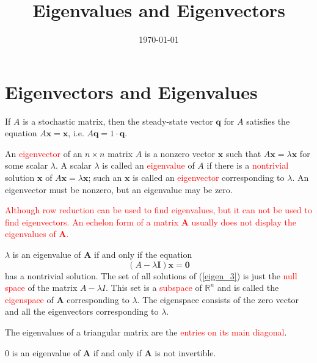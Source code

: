 \documentclass[12pt,a4paper]{article}
\title{Eigenvalues and Eigenvectors}
\author{}
\date{\today}
\renewcommand{\vec}[1]{\boldsymbol{#1}}
\begin{document}
\maketitle

\section{Eigenvectors and Eigenvalues}
If $A$ is a stochastic matrix, then the steady-state vector $\vec{q}$ for $A$ satisfies the equation $A \vec{x} = \vec{x}$, i.e. $A \vec{q} = 1\cdot \vec{q}$.

\begin{tcolorbox}[colback=green!5,colframe=green!40!black,title= Definition]
An \textcolor{red}{eigenvector} of an $n\times n$ matrix $A$ is a nonzero vector $\vec{x}$ such that $A \vec{x} = \lambda \vec{x}$ for some scalar $\lambda$. A scalar $\lambda$ is called an \textcolor{red}{eigenvalue} of $A$ if there is a \textcolor{red}{nontrivial} solution $\vec{x}$ of $A \vec{x} = \lambda \vec{x}$; such an $\vec{x}$ is called an \textcolor{red}{eigenvector} corresponding to $\lambda$. An eigenvector must be nonzero, but an eigenvalue may be zero.
\end{tcolorbox}
\textcolor{red}{Although row reduction can be used to find eigenvalues, but it can not be used to find eigenvectors. An echelon form of a matrix $\mathbf{A}$ usually does not display the eigenvalues of $\mathbf{A}$.}


$\lambda$ is an eigenvalue of $\mathbf{A}$ if and only if the equation
\begin{equation}
(A -\lambda \boldsymbol{I}) \vec{x} = \vec{0}
\label{eigen_3}
\end{equation}
has a nontrivial solution. The set of all solutions of (\ref{eigen_3}) is just the \textcolor{red}{null space} of the matrix $A − \lambda I$.  This set is a \textcolor{red}{subspace} of $\mathbb{R}^n$ and is called the \textcolor{red}{eigenspace} of $\mathbf{A}$ corresponding to $\lambda$. The eigenspace consists of the zero vector and all the eigenvectors corresponding to $\lambda$.

\begin{tcolorbox}[colback=green!5,colframe=green!40!black,title=Theorem]
The eigenvalues of a triangular matrix are the  \textcolor{red}{entries on its main diagonal}.
\end{tcolorbox}

	
$0$ is an eigenvalue of $\mathbf{A}$ if and only if $\mathbf{A}$ is not invertible.
\end{document}
